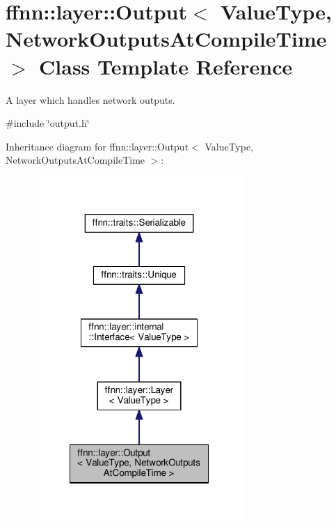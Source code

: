 \hypertarget{classffnn_1_1layer_1_1_output}{\section{ffnn\-:\-:layer\-:\-:Output$<$ Value\-Type, Network\-Outputs\-At\-Compile\-Time $>$ Class Template Reference}
\label{classffnn_1_1layer_1_1_output}
}


A layer which handles network outputs.  




{\ttfamily \#include \char`\"{}output.\-h\char`\"{}}



Inheritance diagram for ffnn\-:\-:layer\-:\-:Output$<$ Value\-Type, Network\-Outputs\-At\-Compile\-Time $>$\-:\nopagebreak
\begin{figure}[H]
\begin{center}
\leavevmode
\includegraphics[width=228pt]{classffnn_1_1layer_1_1_output__inherit__graph}
\end{center}
\end{figure}


